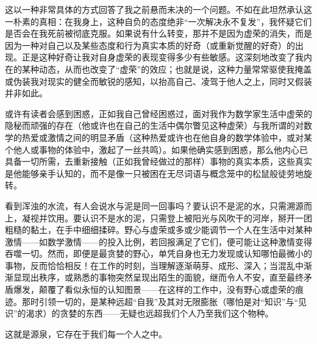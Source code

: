 这以一种非常具体的方式回答了我之前悬而未决的一个问题。不如在此坦然承认这一朴素的真相：在我身上，这种自负的态度绝非“一次解决永不复发”，我怀疑它们是否会在我死前被彻底克服。如果说有什么转变，那并不是因为虚荣的消失，而是因为一种对自己以及某些态度和行为真实本质的好奇（或重新觉醒的好奇）的出现。正是这种好奇让我对自身虚荣的表现变得多少有些敏感。这深刻地改变了我内在的某种动态，从而也改变了“虚荣”的效应；也就是说，这种力量常常驱使我掩盖或伪装我对现实的健全而敏锐的感知，以抬高自己、凌驾于他人之上，同时又假装并非如此。

或许有读者会感到困惑，正如我自己曾经困惑过，面对我作为数学家生活中虚荣的隐秘而顽强的存在（他或许也在自己的生活中偶尔瞥见这种虚荣）与我所谓的对数学的热爱或激情之间的明显矛盾（这种热爱或许也在他自身的数学体验中，或对某个他人或事物的体验中，激起了一丝共鸣）。如果他确实感到困惑，那么他内心已具备一切所需，去重新接触（正如我曾经做过的那样）事物的真实本质，这些真实是他能够亲手认知的，而不是像一只被困在无尽词语与概念笼中的松鼠般徒劳地旋转。

看到浑浊的水流，有人会说水与泥是同一回事吗？要认识不是泥的水，只需溯源而上，凝视并饮用。要认识不是水的泥，只需登上被阳光与风吹干的河岸，掰开一团粗糙的黏土，在手中细细揉碎。野心与虚荣或多或少能调节一个人在生活中对某种激情——如数学激情——的投入比例，若回报满足了它们，便可能让这种激情变得吞噬一切。然而，即便是最贪婪的野心，单凭自身也无力发现或认知哪怕最微小的事物，反而恰恰相反！在工作的时刻，当理解逐渐萌芽、成形、深入；当混乱中渐渐显现出秩序，或熟悉的事物突然呈现出陌生的面貌，继而令人不安，直至最终矛盾爆发，颠覆了看似永恒的认知图景——在这样的工作中，没有野心或虚荣的痕迹。那时引领一切的，是某种远超“自我”及其对无限膨胀（哪怕是对“知识”与“见识”的渴求）的贪婪的东西——无疑也远超我们个人乃至我们这个物种。

这就是源泉，它存在于我们每一个人之中。